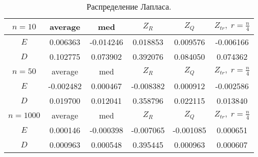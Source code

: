 \documentclass[a4]{article}
\begin{document}
		\begin{table}[h]
			\caption{ Распределение Лапласа.}
			\begin{center}
				\begin{tabular}{|c|c|c|c|c|c|}
					\hline
					$n = 10$ & average & med & $Z_R$ & $Z_Q$ & $Z_{tr},\;r=\frac{n}{4}$\\ \hline
					$E$      & 0.006363         & -0.014246        & 0.018853         & 0.009576         & -0.006166        \\ \hline
					$D$      & 0.102775         & 0.073902         & 0.392076         & 0.084050         & 0.074362         \\ \hline
					\hline
					$n = 50$ & average & med & $Z_R$ & $Z_Q$ & $Z_{tr},\;r=\frac{n}{4}$\\ \hline
					$E$      & -0.002482        & 0.000467         & -0.008382        & 0.000912         & -0.002586        \\ \hline
					$D$      & 0.019700         & 0.012041         & 0.358796         & 0.022115         & 0.013840         \\ \hline
					\hline
					$n =1000$ & average & med & $Z_R$ & $Z_Q$ & $Z_{tr},\;r=\frac{n}{4}$\\ \hline
					$E$      & 0.000146         & -0.000398        & -0.007065        & -0.001085        & 0.000651         \\ \hline
					$D$      & 0.000963         & 0.000548         & 0.395445         & 0.000963         & 0.000607         \\ \hline
				\end{tabular}
			\end{center}
		\end{table}
		
\end{document}
